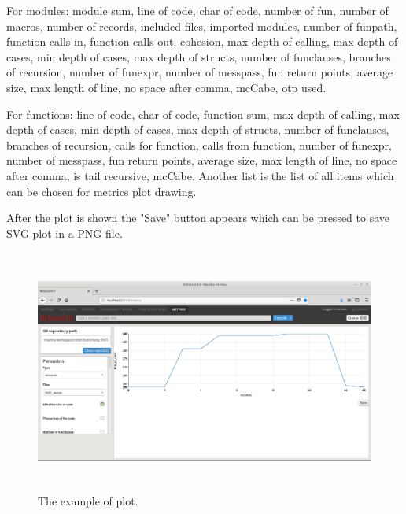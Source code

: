For modules: module sum, line of code, char of code, number of fun, number of macros, number of records, included files, imported modules, number of funpath, function calls in, function calls out, cohesion, max depth of calling, max depth of cases, min depth of cases, max depth of structs, number of funclauses, branches of recursion, number of funexpr, number of messpass, fun return points, average size, max length of line, no space after comma, mcCabe, otp used.

For functions: line of code, char of code, function sum, max depth of calling, max depth of cases, min depth of cases, max depth of structs, number of funclauses, branches of recursion, calls for function, calls from function, number of funexpr, number of messpass, fun return points, average size, max length of line, no space after comma, is tail recursive, mcCabe. Another list is the list of all items which can be chosen for metrics plot drawing. 

After the plot is shown the "Save" button appears which can be pressed to save SVG plot in a PNG file. 

\begin{figure}[ht]
	\includegraphics[height=80mm]{figures/plot.png}
	\caption{The example of plot.}
	\label{fig:metrics_plot}
\end{figure}